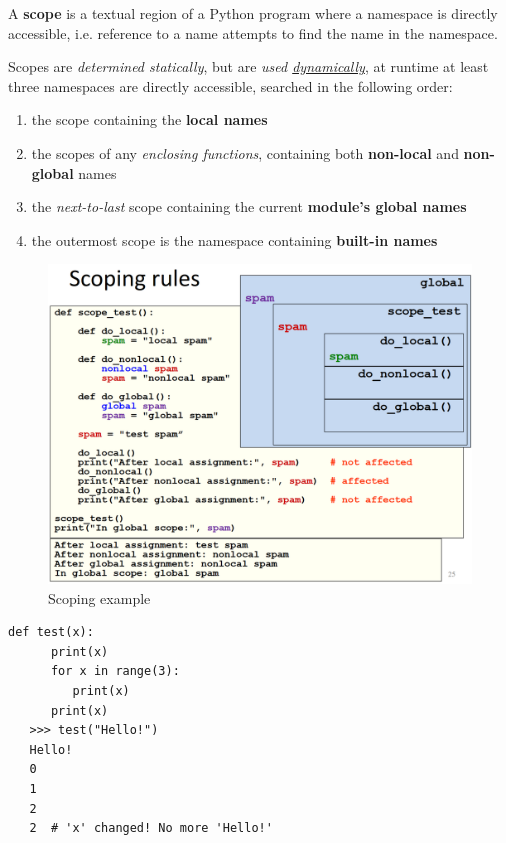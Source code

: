 A \textbf{scope} is a textual region of a Python program where a
namespace is directly accessible, i.e. reference to a name
attempts to find the name in the namespace.

Scopes are \textit{determined statically}, but are \textit{used \underline{dynamically}},
at runtime at least three namespaces are directly accessible, searched in the following order:
\begin{enumerate}
   \item the scope containing the \textbf{local names}
   \item the scopes of any \textit{enclosing functions}, containing both \textbf{non-local} and \textbf{non-global} names
   \item the \textit{next-to-last} scope containing the current \textbf{module’s global names}
   \item the outermost scope is the namespace containing \textbf{built-in names}
\end{enumerate}

\begin{figure}[htbp]
   \centering
   \includegraphics{images/python_scope.png}
   \caption{Scoping example}
   \label{fig:python_scope}
\end{figure}

\begin{lstlisting}[caption={Scoping issues}]
   def test(x):
      print(x)
      for x in range(3):
         print(x)
      print(x)
   >>> test("Hello!")
   Hello!
   0
   1
   2
   2  # 'x' changed! No more 'Hello!'
\end{lstlisting}

